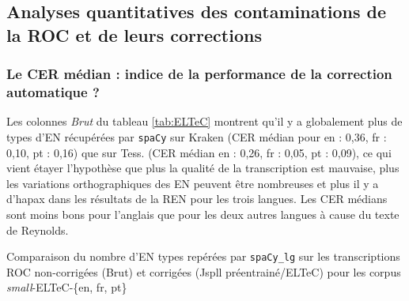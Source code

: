 
%    

%    


\subsection{Analyses quantitatives des contaminations de la ROC et de leurs corrections}
\label{subsec:quantitative_COR-OCR-IMPACT-NER}
\subsubsection{Le CER médian : indice de la performance de la correction automatique ?}
\label{subsubsec:seuil}
Les colonnes \textit{Brut} du tableau \ref{tab:ELTeC} montrent qu'il y a globalement plus de types d'EN récupérées par \texttt{spaCy} sur Kraken (CER médian pour en : 0,36, fr : 0,10, pt : 0,16) que sur Tess. (CER médian en : 0,26, fr : 0,05, pt : 0,09), ce qui vient étayer l'hypothèse que plus la qualité de la transcription est mauvaise, plus les variations orthographiques des EN peuvent être nombreuses et plus il y a d'hapax dans les résultats de la REN pour les trois langues. Les CER médians sont moins bons pour l'anglais que pour les deux autres langues à cause du texte de Reynolds.
\begin{table}[h!]
    \centering
    \scriptsize
    
    \caption{Comparaison du nombre d'EN types repérées par \texttt{spaCy\_lg} sur les transcriptions ROC non-corrigées (Brut) et corrigées (Jspll préentrainé/ELTeC) pour les corpus \textit{small}-ELTeC-\{en, fr, pt\}}
    \label{tab:ELTeC}
\end{table} 

